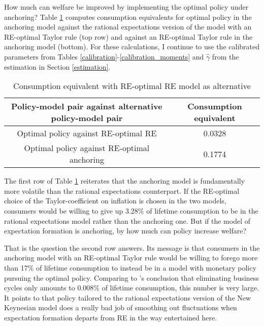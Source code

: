 \documentclass[11pt]{article}
\renewcommand{\[}{\begin{equation}}
\renewcommand{\]}{\end{equation}}
\begin{document}
How much can welfare be improved by implementing the optimal policy under anchoring? 
Table \ref{table_welfare} computes consumption equivalents for optimal policy in the anchoring model against the rational expectations version of the model with an RE-optimal Taylor rule (top row) and against an RE-optimal Taylor rule in the anchoring model (bottom). For these calculations, I continue to use the calibrated parameters from Tables \ref{calibration}-\ref{calibration_moments} and $\hat{\gamma}$ from the estimation in Section \ref{estimation}.

\begin{center}
\begin{table}[h!]
\begin{tabular}{ c | c}
 Policy-model pair against alternative policy-model pair& Consumption equivalent \\  \hline
Optimal policy against RE-optimal RE & 0.0328 \\  \hline  
Optimal policy against RE-optimal anchoring  & 0.1774 \\  \hline  
\end{tabular}     
      \caption{Consumption equivalent with RE-optimal RE model as alternative }  
      \label{table_welfare}
 \end{table}
\end{center}

The first row of Table \ref{table_welfare} reiterates that the anchoring model is fundamentally more volatile than the rational expectations counterpart. If the RE-optimal choice of the Taylor-coefficient on inflation is chosen in the two models, consumers would be willing to give up 3.28\% of lifetime consumption to be in the rational expectations model rather than the anchoring one. But if the model of expectation formation is anchoring, by how much can policy increase welfare?

That is the question the second row answers. Its message is that consumers in the anchoring model with an RE-optimal Taylor rule would be willing to forego more than 17\% of lifetime consumption to instead be in a model with monetary policy pursuing the optimal policy. Comparing to \cite{lucas1987models}'s conclusion that eliminating business cycles only amounts to 0.008\% of lifetime consumption, this number is very large. It points to that policy tailored to the rational expectations version of the New Keynesian model does a really bad job of smoothing out fluctuations when expectation formation departs from RE in the way entertained here. 
\end{document}

